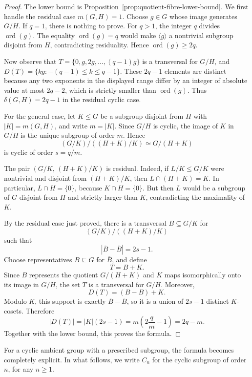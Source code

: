\documentclass[reqno]{amsart}
\numberwithin{equation}{section}
\theoremstyle{definition}
\begin{document}
\begin{proof}
The lower bound is Proposition~\ref{prop:quotient-fibre-lower-bound}.
We first handle the residual case \(m(G,H)=1\).  Choose \(g\in G\) whose image
generates \(G/H\).  If \(q=1\), there is nothing to prove.  For \(q>1\), the
integer \(q\) divides \(\operatorname{ord}(g)\).  The equality
\(\operatorname{ord}(g)=q\) would make \(\langle g\rangle\) a nontrivial
subgroup disjoint from \(H\), contradicting residuality.  Hence
$
  \operatorname{ord}(g)\geq 2q.
$

Now observe that
$
  T=\{0,g,2g,\ldots,(q-1)g\}
$
is a transversal for \(G/H\), and
$
  D(T)=\{kg:-(q-1)\leq k\leq q-1\}
$.
These \(2q-1\) elements are distinct because any two exponents in the displayed
range differ by an integer of absolute value at most \(2q-2\), which is
strictly smaller than \(\operatorname{ord}(g)\).  Thus
\(\delta(G,H)=2q-1\) in the residual cyclic case.

For the general case, let
$K\leq G$ be a subgroup disjoint from $H$ with $|K|=m(G,H)$, and write
$m=|K|$.  Since $G/H$ is cyclic, the image of $K$ in $G/H$ is the unique
subgroup of order $m$.  Hence
\[
  (G/K)/((H+K)/K)\simeq G/(H+K)
\]
is cyclic of order $s=q/m$.

The pair $(G/K,\,(H+K)/K)$ is residual.  Indeed, if $L/K\leq G/K$ were nontrivial and disjoint from
$(H+K)/K$, then $L\cap(H+K)=K$.
In particular, $L\cap H=\{0\}$, because $K\cap H=\{0\}$.  But then $L$ would be
a subgroup of $G$ disjoint from $H$ and strictly larger than $K$, contradicting
the maximality of $K$. 

By the residual case just proved, there is a transversal
$\overline B\subseteq G/K$ for
\[
  (G/K)/((H+K)/K)
\]
such that
\[
  |\overline B-\overline B|=2s-1.
\]
Choose representatives $B\subseteq G$ for $\overline B$, and define
\[
  T=B+K.
\]
Since $B$ represents the quotient $G/(H+K)$ and $K$ maps isomorphically onto its
image in $G/H$, the set $T$ is a transversal for $G/H$.  Moreover,
\[
  D(T)=(B-B)+K.
\]
Modulo $K$, this support is exactly $\overline B-\overline B$, so it is a union
of $2s-1$ distinct $K$-cosets.  Therefore
\[
  |D(T)|=|K|(2s-1)=m\left(2\frac qm-1\right)=2q-m.
\]
Together with the lower bound, this proves the formula.
\end{proof}

For a cyclic ambient group with a prescribed subgroup, the formula becomes
completely explicit. In what follows, we write $C_n$ for the cyclic subgroup of order $n$, for any $n \geq 1$.
\end{document}
